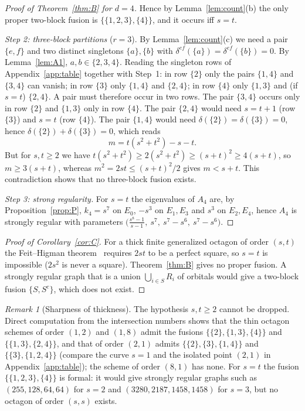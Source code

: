 \documentclass[11pt]{article}
\theoremstyle{remark}
\newtheorem{remark}[theorem]{Remark}
\begin{document}
\begin{proof}[Proof of Theorem~\ref{thm:B} for $d=4$]
Hence by Lemma~\ref{lem:count}(b) the only proper two-block fusion is $\{\{1,2,3\},\{4\}\}$, and it occurs iff $s=t$.

\smallskip\emph{Step 2: three-block partitions} ($r=3$). By Lemma~\ref{lem:count}(c) we need a pair $\{e,f\}$ and two distinct singletons $\{a\},\{b\}$ with $\delta^{ef}(\{a\})=\delta^{ef}(\{b\})=0$. By Lemma~\ref{lem:A1}, $a,b\in\{2,3,4\}$. Reading the singleton rows of Appendix~\ref{app:table} together with Step~1: in row $\{2\}$ only the pairs $\{1,4\}$ and $\{3,4\}$ can vanish; in row $\{3\}$ only $\{1,4\}$ and $\{2,4\}$; in row $\{4\}$ only $\{1,3\}$ and (if $s=t$) $\{2,4\}$. A pair must therefore occur in two rows. The pair $\{3,4\}$ occurs only in row $\{2\}$ and $\{1,3\}$ only in row $\{4\}$. The pair $\{2,4\}$ would need $s=t+1$ (row $\{3\}$) and $s=t$ (row $\{4\}$). The pair $\{1,4\}$ would need $\delta(\{2\})=\delta(\{3\})=0$, hence $\delta(\{2\})+\delta(\{3\})=0$, which reads
\[
m=t(s^2+t^2)-s-t .
\]
But for $s,t\ge2$ we have $t(s^2+t^2)\ge2(s^2+t^2)\ge(s+t)^2\ge4(s+t)$, so $m\ge3(s+t)$, whereas $m^2=2st\le(s+t)^2/2$ gives $m<s+t$. This contradiction shows that no three-block fusion exists.

\smallskip\emph{Step 3: strong regularity.} For $s=t$ the eigenvalues of $A_4$ are, by Proposition~\ref{prop:P}, $k_4=s^7$ on $E_0$, $-s^3$ on $E_1,E_3$ and $s^3$ on $E_2,E_4$, hence $A_4$ is strongly regular with parameters
$\bigl(\tfrac{s^8-1}{s-1},\ s^7,\ s^7-s^6,\ s^7-s^6\bigr)$.
\end{proof}

\begin{proof}[Proof of Corollary~\ref{cor:C}]
For a thick finite generalized octagon of order $(s,t)$ the Feit--Higman theorem~\cite{FH} requires $2st$ to be a perfect square, so $s=t$ is impossible ($2s^2$ is never a square). Theorem~\ref{thm:B} gives no proper fusion. A strongly regular graph that is a union $\bigcup_{i\in S}R_i$ of orbitals would give a two-block fusion $\{S,S^c\}$, which does not exist.
\end{proof}

\begin{remark}[Sharpness of thickness]
The hypothesis $s,t\ge2$ cannot be dropped. Direct computation from the intersection numbers shows that the thin octagon schemes of order $(1,2)$ and $(1,8)$ admit the fusions $\{\{2\},\{1,3\},\{4\}\}$ and $\{\{1,3\},\{2,4\}\}$, and that of order $(2,1)$ admits $\{\{2\},\{3\},\{1,4\}\}$ and $\{\{3\},\{1,2,4\}\}$ (compare the curve $s=1$ and the isolated point $(2,1)$ in Appendix~\ref{app:table}); the scheme of order $(8,1)$ has none. For $s=t$ the fusion $\{\{1,2,3\},\{4\}\}$ is formal: it would give strongly regular graphs such as $(255,128,64,64)$ for $s=2$ and $(3280,2187,1458,1458)$ for $s=3$, but no octagon of order $(s,s)$ exists.
\end{remark}
\end{document}
